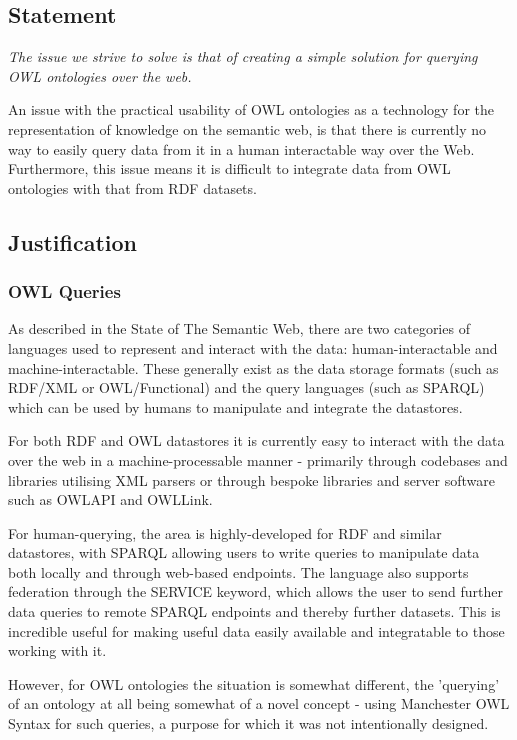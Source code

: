 \documentclass{article}
\begin{document}
\subsection{Statement}

\emph{The issue we strive to solve is that of creating a simple solution for querying
OWL ontologies over the web.}

An issue with the practical usability of OWL ontologies as a technology for the
representation of knowledge on the semantic web, is that there is currently no
way to easily query data from it in a human interactable way over the Web.
Furthermore, this issue means it is difficult to integrate data from OWL
ontologies with that from RDF datasets. 

\subsection{Justification}

\subsubsection{OWL Queries}

As described in the State of The Semantic Web, there are two categories of
languages used to represent and interact with the data: human-interactable and
machine-interactable. These generally exist as the data storage formats (such as
RDF/XML or OWL/Functional) and the query languages (such as SPARQL) which can be 
used by humans to manipulate and integrate the datastores.

For both RDF and OWL datastores it is currently easy to interact with the data
over the web in a machine-processable manner - primarily through codebases and
libraries utilising XML parsers or through bespoke libraries and server software 
such as OWLAPI and OWLLink.

For human-querying, the area is highly-developed for RDF and similar datastores, 
with SPARQL allowing users to write queries to manipulate data both locally and
through web-based endpoints. The language also supports federation through the
SERVICE keyword, which allows the user to send further data queries to remote
SPARQL endpoints and thereby further datasets. This is incredible useful for
making useful data easily available and integratable to those working with it.

However, for OWL ontologies the situation is somewhat different, the 'querying'
of an ontology at all being somewhat of a novel concept - using Manchester OWL
Syntax for such queries, a purpose for which it was not intentionally designed.
\end{document}
